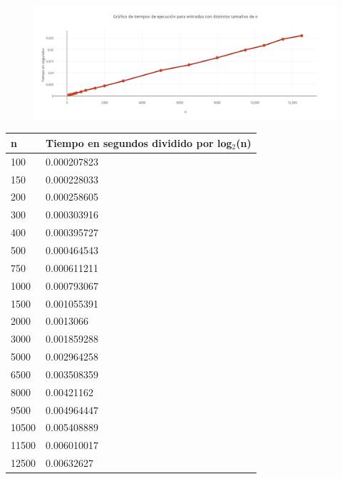   \begin{figure}[h!]
   \begin{center}
 	\includegraphics[scale=1.7]{imagenes/ej2/grafiquitos/graf1.png}
   \end{center}
 \end{figure}
 \newpage

\begin{table}[htb]
\centering
\begin{tabular}[c]{|l|l|}

		\hline
n & Tiempo en segundos dividido por log$_2$(n)\\ 
 	\hline
100	&	0.000207823	\\
 	\hline
 150	&	0.000228033	\\
	\hline
 200	&	0.000258605	\\
	\hline
 300	&	0.000303916	\\
	\hline
 400	&	0.000395727	\\
	\hline
 500	&	0.000464543	\\
	\hline
 750	&	0.000611211	\\
	\hline
 1000	&	0.000793067	\\
	\hline
 1500	&	0.001055391	\\
	\hline
 2000	&	0.0013066	\\
	\hline
 3000	&	0.001859288	\\
	\hline
 5000	&	0.002964258	\\
	\hline
 6500	&	0.003508359	\\
	\hline
 8000	&	0.00421162	\\
	\hline
 9500	&	0.004964447	\\
	\hline
 10500	&	0.005408889	\\
	\hline
 11500	&	0.006010017	\\
	\hline
 12500	&	0.00632627	\\
	\hline
  	
		
		
		
	\end{tabular}
\end{table}
 
